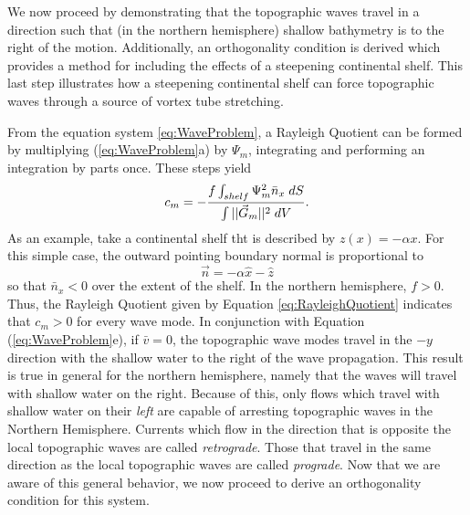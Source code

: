 \documentclass[12pt]{workjournal}
\begin{document}
We now proceed by demonstrating that the topographic waves travel in a direction such that (in the northern hemisphere) shallow bathymetry is to the right of the motion. Additionally, an orthogonality condition is derived which provides a method for including the effects of a steepening continental shelf. This last step illustrates how a steepening continental shelf can force topographic waves through a source of vortex tube stretching.

From the equation system \eqref{eq:WaveProblem}, a Rayleigh Quotient can be formed by multiplying (\ref{eq:WaveProblem}a) by $\Psi_m$, integrating and performing an integration by parts once. These steps yield 
\begin{equation}
c_m = -\frac{f \int_{shelf}\Psi_m^2 \bar{n}_x \hspace{1mm} dS }{\int ||\vec{G}_m||^2 \hspace{1mm} dV }. \label{eq:RayleighQuotient}
\end{equation}
As an example, take a continental shelf tht is described by $z(x) = -\alpha x$. For this simple case, the outward pointing boundary normal is proportional to
\begin{equation}
\vec{n} = -\alpha \hat{x} - \hat{z}
\end{equation}
so that $\bar{n}_x < 0 $ over the extent of the shelf. In the northern hemisphere, $f>0$. Thus, the Rayleigh Quotient given by Equation \eqref{eq:RayleighQuotient} indicates that $c_m > 0$ for every wave mode. In conjunction with Equation (\ref{eq:WaveProblem}e), if $\bar{v}=0$, the topographic wave modes travel in the $-y$ direction with the shallow water to the right of the wave propagation. This result is true in general for the northern hemisphere, namely that the waves  will travel with shallow water on the right. Because of this, only flows which travel with shallow water on their \textit{left} are capable of arresting topographic waves in the Northern Hemisphere. Currents which flow in the direction that is opposite the local topographic waves are called  \textit{retrograde}. Those that travel in the same direction as the local topographic waves are called \textit{prograde}. Now that we are aware of this general behavior, we now proceed to derive an orthogonality condition for this system.
\end{document}
